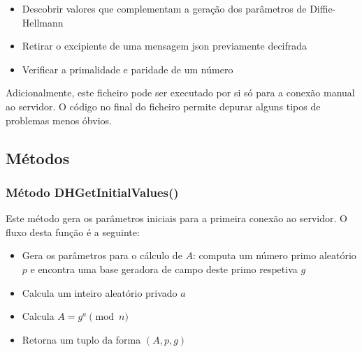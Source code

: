 \documentclass{report}
\begin{document}
\begin{itemize}
\item Descobrir valores que complementam a geração dos parâmetros de Diffie-Hellmann
\item Retirar o excipiente de uma mensagem \ac{json} previamente decifrada
\item Verificar a primalidade e paridade de um número
\end{itemize}
Adicionalmente, este ficheiro pode ser executado por si só para a conexão manual ao servidor. O código no final do ficheiro permite depurar alguns tipos de problemas menos óbvios.

\subsection{Métodos}
\subsubsection{Método DHGetInitialValues()}
Este método gera os parâmetros iniciais para a primeira conexão ao servidor. O fluxo desta função é a seguinte:

\begin{itemize}
\item Gera os parâmetros para o cálculo de $A$: computa um número primo aleatório $p$ e encontra uma base geradora de campo deste primo respetiva $g$
\item Calcula um inteiro aleatório privado $a$
\item Calcula $A=g^a\pmod{n}$
\item Retorna um tuplo da forma $(A,p,g)$
\end{itemize}
\end{document}
